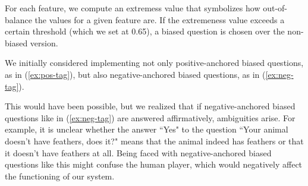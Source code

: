 \documentclass[11pt,a4paper]{article}
\newcommand{\askaboutfeat}{\texttt{ask\_about\_feature()}}
\begin{document}
For each feature, we compute an extremess value that symbolizes how out-of-balance the values for a given feature are.
If the extremeness value exceeds a certain threshold (which we set at 0.65), a biased question is chosen over the non-biased version.

We initially considered implementing not only positive-anchored biased questions, as in (\ref{ex:pos-tag}), but also negative-anchored biased questions, as in (\ref{ex:neg-tag}).

\label{ex:pos-tag} 
\vspace{-1.25\baselineskip}
\label{ex:neg-tag}

This would have been possible,  but we realized that if negative-anchored biased questions like in (\ref{ex:neg-tag}) are answered affirmatively, ambiguities arise.
For example, it is unclear whether the answer ``Yes" to the question ``Your animal doesn’t have feathers, does it?" means that the animal indeed has feathers or that it doesn’t have feathers at all.
Being faced with negative-anchored biased questions like this might confuse the human player, which would negatively affect the functioning of our system.




\end{document}
